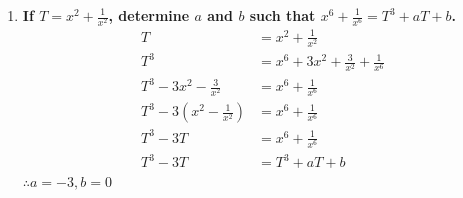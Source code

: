 \documentclass[12pt]{article}
\begin{document}
\begin{enumerate}
    \item \textbf{If $T = x^2 + \frac{1}{x^2}$, determine $a$ and $b$ such that $x^6 + \frac{1}{x^6} = T^3 + aT + b$.}
    \begin{align*}
        T &= x^2+\frac{1}{x^2} \\
        T^3 &= x^6+3x^2+\frac{3}{x^2}+\frac{1}{x^6} \\
        T^3-3x^2-\frac{3}{x^2} &= x^6+\frac{1}{x^6} \\
        T^3-3(x^2-\frac{1}{x^2}) &= x^6+\frac{1}{x^6} \\
        T^3-3T &= x^6+\frac{1}{x^6} \\
        T^3-3T &= T^3+aT+b \\
    \end{align*}
    $\therefore a = -3, b = 0$ 
\end{enumerate}
\end{document}
